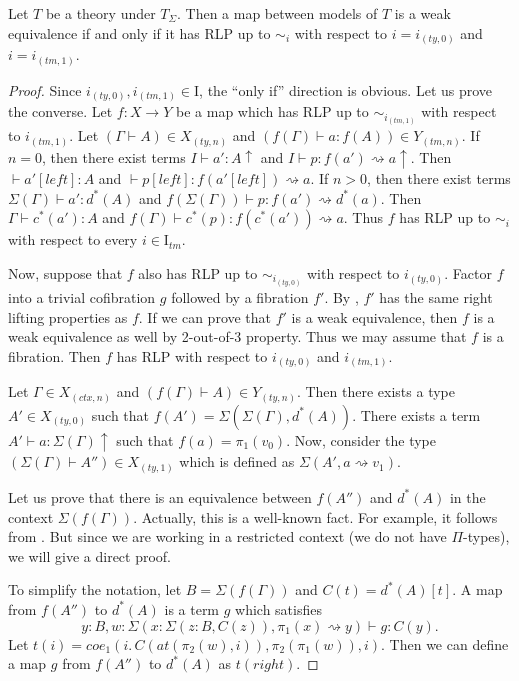 \documentclass[reqno]{amsart}
\theoremstyle{definition}
\theoremstyle{remark}
\newcommand{\idtype}{\rightsquigarrow}
\newcommand{\I}{\mathrm{I}}
\numberwithin{figure}{section}
\begin{document}
\begin{prop}[sigma-we-i]
Let $T$ be a theory under $T_\Sigma$.
Then a map between models of $T$ is a weak equivalence if and only if it has RLP up to $\sim_i$ with respect to $i = i_{(ty,0)}$ and $i = i_{(tm,1)}$.
\end{prop}
\begin{proof}
Since $i_{(ty,0)},i_{(tm,1)} \in \I$, the ``only if'' direction is obvious.
Let us prove the converse.
Let $f : X \to Y$ be a map which has RLP up to $\sim_{i_{(tm,1)}}$ with respect to $i_{(tm,1)}$.
Let $(\Gamma \vdash A) \in X_{(ty,n)}$ and $(f(\Gamma) \vdash a : f(A)) \in Y_{(tm,n)}$.
If $n = 0$, then there exist terms $I \vdash a' : A\!\uparrow$ and $I \vdash p : f(a') \idtype a\!\uparrow$.
Then $\vdash a'[left] : A$ and $\vdash p[left] : f(a'[left]) \idtype a$.
If $n > 0$, then there exist terms $\Sigma(\Gamma) \vdash a' : d^*(A)$ and $f(\Sigma(\Gamma)) \vdash p : f(a') \idtype d^*(a)$.
Then $\Gamma \vdash c^*(a') : A$ and $f(\Gamma) \vdash c^*(p) : f(c^*(a')) \idtype a$.
Thus $f$ has RLP up to $\sim_i$ with respect to every $i \in \I_{tm}$.

Now, suppose that $f$ also has RLP up to $\sim_{i_{(ty,0)}}$ with respect to $i_{(ty,0)}$.
Factor $f$ into a trivial cofibration $g$ followed by a fibration $f'$.
By \cite[lemma~3.4]{f-model-structures}, $f'$ has the same right lifting properties as $f$.
If we can prove that $f'$ is a weak equivalence, then $f$ is a weak equivalence as well by 2-out-of-3 property.
Thus we may assume that $f$ is a fibration.
Then $f$ has RLP with respect to $i_{(ty,0)}$ and $i_{(tm,1)}$.

Let $\Gamma \in X_{(ctx,n)}$ and $(f(\Gamma) \vdash A) \in Y_{(ty,n)}$.
Then there exists a type $A' \in X_{(ty,0)}$ such that $f(A') = \Sigma(\Sigma(\Gamma),d^*(A))$.
There exists a term $A' \vdash a : \Sigma(\Gamma)\!\uparrow$ such that $f(a) = \pi_1(v_0)$.
Now, consider the type $(\Sigma(\Gamma) \vdash A'') \in X_{(ty,1)}$ which is defined as $\Sigma(A', a \idtype v_1)$.

Let us prove that there is an equivalence between $f(A'')$ and $d^*(A)$ in the context $\Sigma(f(\Gamma))$.
Actually, this is a well-known fact.
For example, it follows from \cite[lemmas 3.11.8 and 3.11.9]{hottbook}.
But since we are working in a restricted context (we do not have $\Pi$-types), we will give a direct proof.

To simplify the notation, let $B = \Sigma(f(\Gamma))$ and $C(t) = d^*(A)[t]$.
A map from $f(A'')$ to $d^*(A)$ is a term $g$ which satisfies
\[ y : B, w : \Sigma(x : \Sigma(z : B, C(z)), \pi_1(x) \idtype y) \vdash g : C(y). \]
Let $t(i) = coe_1(i.\,C(at(\pi_2(w),i)), \pi_2(\pi_1(w)), i)$.
Then we can define a map $g$ from $f(A'')$ to $d^*(A)$ as $t(right)$.


\end{proof}
\end{document}
